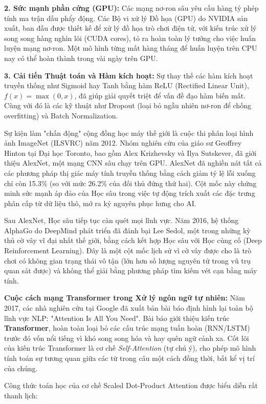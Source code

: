 \documentclass[12pt,a4paper]{article}
\begin{document}
\textbf{2. Sức mạnh phần cứng (GPU):} Các mạng nơ-ron sâu yêu cầu hàng tỷ phép tính ma trận dấu phẩy động. Các Bộ vi xử lý Đồ họa (GPU) do NVIDIA sản xuất, ban đầu được thiết kế để xử lý đồ họa trò chơi điện tử, với kiến trúc xử lý song song hàng nghìn lõi (CUDA cores), tỏ ra hoàn toàn lý tưởng cho việc huấn luyện mạng nơ-ron. Một mô hình từng mất hàng tháng để huấn luyện trên CPU nay có thể hoàn thành trong vài ngày trên GPU.

\textbf{3. Cải tiến Thuật toán và Hàm kích hoạt:} Sự thay thế các hàm kích hoạt truyền thống như Sigmoid hay Tanh bằng hàm ReLU (Rectified Linear Unit), $f(x) = \max(0, x)$, đã giúp giải quyết triệt để vấn đề đạo hàm biến mất. Cùng với đó là các kỹ thuật như Dropout (loại bỏ ngẫu nhiên nơ-ron để chống overfitting) và Batch Normalization.

Sự kiện làm "chấn động" cộng đồng học máy thế giới là cuộc thi phân loại hình ảnh ImageNet (ILSVRC) năm 2012. Nhóm nghiên cứu của giáo sư Geoffrey Hinton tại Đại học Toronto, bao gồm Alex Krizhevsky và Ilya Sutskever, đã giới thiệu AlexNet, một mạng CNN sâu chạy trên GPU. AlexNet đã nghiền nát tất cả các phương pháp thị giác máy tính truyền thống bằng cách giảm tỷ lệ lỗi xuống chỉ còn 15.3\% (so với mức 26.2\% của đối thủ đứng thứ hai). Cột mốc này chứng minh sức mạnh áp đảo của Học sâu trong việc tự động trích xuất các đặc trưng phân cấp từ dữ liệu thô, mở ra kỷ nguyên phục hưng cho AI.

Sau AlexNet, Học sâu tiếp tục càn quét mọi lĩnh vực. Năm 2016, hệ thống AlphaGo do DeepMind phát triển đã đánh bại Lee Sedol, một trong những kỳ thủ cờ vây vĩ đại nhất thế giới, bằng cách kết hợp Học sâu với Học củng cố (Deep Reinforcement Learning). Đây là một cột mốc lịch sử vì cờ vây được cho là trò chơi có không gian trạng thái vô tận (lớn hơn số lượng nguyên tử trong vũ trụ quan sát được) và không thể giải bằng phương pháp tìm kiếm vét cạn bằng máy tính.

\textbf{Cuộc cách mạng Transformer trong Xử lý ngôn ngữ tự nhiên:}
Năm 2017, các nhà nghiên cứu tại Google đã xuất bản bài báo định hình lại toàn bộ lĩnh vực NLP: "Attention Is All You Need". Bài báo giới thiệu kiến trúc \textbf{Transformer}, hoàn toàn loại bỏ các cấu trúc mạng tuần hoàn (RNN/LSTM) trước đó vốn nổi tiếng vì khó song song hóa và hay quên ngữ cảnh xa. Cốt lõi của kiến trúc Transformer là cơ chế \textit{Self-Attention} (tự chú ý), cho phép mô hình tính toán sự tương quan giữa các từ trong câu một cách đồng thời, bất kể vị trí của chúng.

Công thức toán học của cơ chế Scaled Dot-Product Attention được biểu diễn rất thanh lịch:
\end{document}
